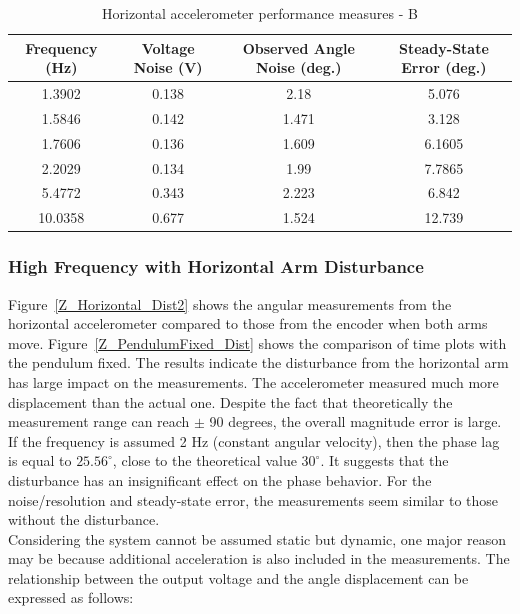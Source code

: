 \documentclass{article}
\theoremstyle{plain}
\theoremstyle{definition}
\theoremstyle{remark}
\begin{document}
\begin{table}
\begin{center}
    \begin{tabular}{|c|c|c|c|}
        \hline
        Frequency (Hz)  & Voltage Noise (V) & Observed Angle Noise (deg.) & Steady-State Error (deg.) \\ \hline
	1.3902  & 0.138  & 2.18 & 5.076\\
       1.5846  & 0.142  & 1.471 & 3.128 \\
	1.7606  & 0.136 & 1.609 & 6.1605  \\
	2.2029 & 0.134  & 1.99 & 7.7865   \\
	5.4772 & 0.343  & 2.223 & 6.842  \\
	10.0358 & 0.677 & 1.524 & 12.739 \\
        \hline
    \end{tabular}
\caption{Horizontal accelerometer performance measures - B}  
\label{horizontal_tableB}
\end{center}
\end{table}


\subsubsection{High Frequency with Horizontal Arm Disturbance}

Figure~\ref{Z_Horizontal_Dist2} shows the angular measurements from the horizontal accelerometer compared to those from the encoder when both arms move. Figure~\ref{Z_PendulumFixed_Dist} shows the comparison of time plots with the pendulum fixed. The results indicate the disturbance from the horizontal arm has large impact on the measurements. The accelerometer measured much more displacement than the actual one. Despite the fact that theoretically the measurement range can reach $\pm$ 90 degrees, the overall magnitude error is large. If the frequency is assumed 2 Hz (constant angular velocity), then the phase lag is equal to $25.56^\circ$, close to the theoretical value $30^\circ$. It suggests that the disturbance has an insignificant effect on the phase behavior. For the noise/resolution and steady-state error, the measurements seem similar to those without the disturbance.\\ 

Considering the system cannot be assumed static but dynamic, one major reason may be because additional acceleration is also included in the measurements. The relationship between the output voltage and the angle displacement can be expressed as follows: 
\end{document}

